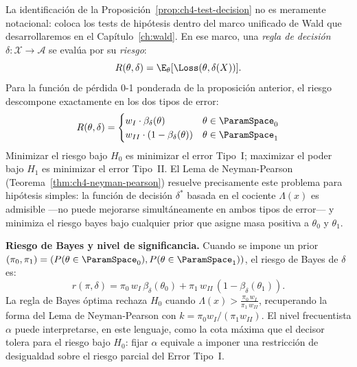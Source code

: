 La identificación de la Proposición~\ref{prop:ch4-test-decision} no es
meramente notacional: coloca los tests de hipótesis dentro del marco unificado
de Wald que desarrollaremos en el Capítulo~\ref{ch:wald}. En ese marco,
una \emph{regla de decisión} $\delta: \mathcal{X} \to \mathcal{A}$ se evalúa
por su \emph{riesgo}:
\[
	R(\theta, \delta) = \E_\theta[\Loss(\theta, \delta(X))].
\]
Para la función de pérdida 0-1 ponderada de la proposición anterior, el riesgo
descompone exactamente en los dos tipos de error:
\[
	R(\theta, \delta) = \begin{cases}
		w_I \cdot \beta_\delta(\theta)       & \theta \in \ParamSpace_0 \\
		w_{II} \cdot (1 - \beta_\delta(\theta)) & \theta \in \ParamSpace_1
	\end{cases}
\]
Minimizar el riesgo bajo $H_0$ es minimizar el error Tipo~I; maximizar el
poder bajo $H_1$ es minimizar el error Tipo~II. El Lema de Neyman-Pearson
(Teorema~\ref{thm:ch4-neyman-pearson}) resuelve precisamente este problema
para hipótesis simples: la función de decisión $\delta^*$ basada en el cociente
$\Lambda(x)$ es admisible ---no puede mejorarse simultáneamente en ambos tipos
de error--- y minimiza el riesgo bayes bajo cualquier prior que asigne masa
positiva a $\theta_0$ y $\theta_1$.

\textbf{Riesgo de Bayes y nivel de significancia.} Cuando se impone un prior
$(\pi_0, \pi_1) = (P(\theta \in \ParamSpace_0), P(\theta \in \ParamSpace_1))$,
el riesgo de Bayes de $\delta$ es:
\[
	r(\pi, \delta) = \pi_0 \, w_I \, \beta_\delta(\theta_0)
	+ \pi_1 \, w_{II} \, (1 - \beta_\delta(\theta_1)).
\]
La regla de Bayes óptima rechaza $H_0$ cuando
$\Lambda(x) > \frac{\pi_0 \, w_I}{\pi_1 \, w_{II}}$, recuperando la forma
del Lema de Neyman-Pearson con $k = \pi_0 w_I / (\pi_1 w_{II})$. El nivel
frecuentista $\alpha$ puede interpretarse, en este lenguaje, como la cota
máxima que el decisor tolera para el riesgo bajo $H_0$: fijar $\alpha$ equivale
a imponer una restricción de desigualdad sobre el riesgo parcial del Error
Tipo~I.

